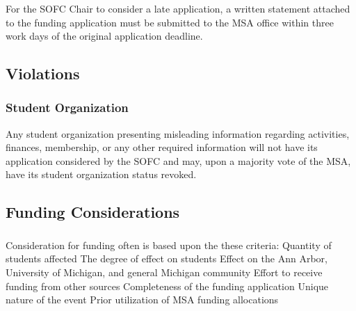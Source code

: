 \subsubsection{}
For the SOFC Chair to consider a late application, a written statement attached to the funding application must be submitted to the MSA office within three work days of the original application deadline.

\subsection{Violations}
\subsubsection{Student Organization}
\subsubsubsection{}
Any student organization presenting misleading information regarding activities, finances, membership, or any other required information will not have its application considered by the SOFC and may, upon a majority vote of the MSA, have its student organization status revoked. 

\subsection{Funding Considerations}
\subsubsection{}
Consideration for funding often is based upon the these criteria:
\subsubsubsection{}
Quantity of students affected
\subsubsubsection{}
The degree of effect on students
\subsubsubsection{}
Effect on the Ann Arbor, University of Michigan, and general Michigan community
\subsubsubsection{}
Effort to receive funding from other sources
\subsubsubsection{}
Completeness of the funding application
\subsubsubsection{}
Unique nature of the event
\subsubsubsection{}
Prior utilization of MSA funding allocations